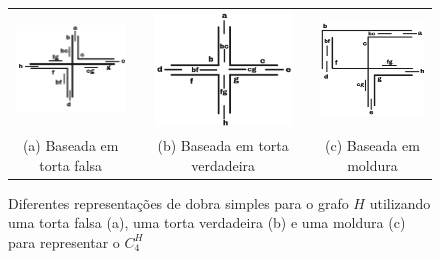 \begin{figure}[htb]
  \centering
  \begin{tabular}{c c c c c }
    \includegraphics[width=4cm]{./img/falsePie.png}  %
    & &\includegraphics[width=4cm]{./img/truePie.png} %
    & &
 \includegraphics[width=4cm]{./img/frame.png} \\%
    {\footnotesize (a) Baseada em torta falsa}  & &  {\footnotesize(b) Baseada em torta verdadeira} & & {\footnotesize (c) Baseada em moldura} %
  \end{tabular}
  \caption{Diferentes representações de dobra simples para o grafo  $H$ utilizando uma  torta falsa (a), uma torta verdadeira (b) e uma moldura (c) para representar o $C_4^{H}$}\label{fig:falsepietruepieframe}
\end{figure} 